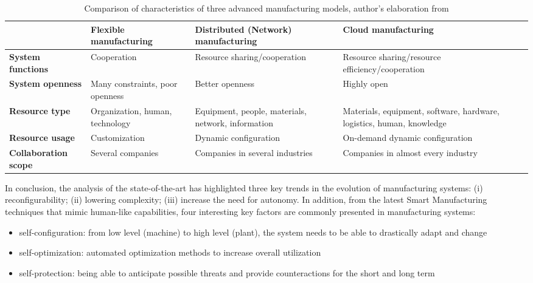 \begin{table}
    \centering
    \begin{tabular}{|p{2cm}|p{2cm}|p{3cm}|p{3cm}|}
        \hline
         & \textbf{Flexible manufacturing} & \textbf{Distributed (Network) manufacturing} & \textbf{Cloud manufacturing}\\
         \hline
         \textbf{System functions} & Cooperation & Resource sharing/cooperation  & Resource sharing/resource efficiency/cooperation \\
         \hline
         \textbf{System openness} & Many constraints, poor openness & Better openness & Highly open \\
         \hline
         \textbf{Resource type} & Organization, human, technology & Equipment, people, materials, network, information & Materials, equipment, software, hardware, logistics, human, knowledge \\
         \hline
         \textbf{Resource usage} & Customization & Dynamic configuration & On-demand dynamic configuration \\
         \hline
         \textbf{Collaboration scope} & Several companies & Companies in several industries & Companies in almost every industry \\
        \hline
    \end{tabular}
    \caption{Comparison of characteristics of three advanced manufacturing models, author’s elaboration from \textcite{wei_product_2020}}
    \label{tab:comp-adv-mfg-models}
\end{table}

In conclusion, the analysis of the state-of-the-art has highlighted three key trends in the evolution of manufacturing systems: (i) reconfigurability; (ii) lowering complexity; (iii) increase the need for autonomy. In addition, from the latest Smart Manufacturing techniques that mimic human-like capabilities, four interesting key factors are commonly presented in manufacturing systems:
\begin{itemize}
    \item self-configuration: from low level (machine) to high level (plant), the system needs to be able to drastically adapt and change
    \item self-optimization: automated optimization methods to increase overall utilization
    \item self-protection: being able to anticipate possible threats and provide counteractions for the short and long term
\end{itemize}


